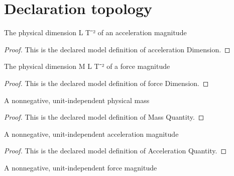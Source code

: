 \section{Declaration topology}
\begin{definition}
  \label{def:physics:phyx-mini-0757:phyxminiproblems-problemphyxmini0757-accelerationdimension}
  The physical dimension L T⁻² of an acceleration magnitude
\end{definition}
\begin{proof}
  This is the declared model definition of acceleration Dimension.
\end{proof}
\begin{definition}
  \label{def:physics:phyx-mini-0757:phyxminiproblems-problemphyxmini0757-forcedimension}
  The physical dimension M L T⁻² of a force magnitude
\end{definition}
\begin{proof}
  This is the declared model definition of force Dimension.
\end{proof}
\begin{definition}
  \label{def:physics:phyx-mini-0757:phyxminiproblems-problemphyxmini0757-massquantity}
  A nonnegative, unit-independent physical mass
\end{definition}
\begin{proof}
  This is the declared model definition of Mass Quantity.
\end{proof}
\begin{definition}
  \label{def:physics:phyx-mini-0757:phyxminiproblems-problemphyxmini0757-accelerationquantity}
  A nonnegative, unit-independent acceleration magnitude
\end{definition}
\begin{proof}
  This is the declared model definition of Acceleration Quantity.
\end{proof}
\begin{definition}
  \label{def:physics:phyx-mini-0757:phyxminiproblems-problemphyxmini0757-forcequantity}
  A nonnegative, unit-independent force magnitude
\end{definition}
